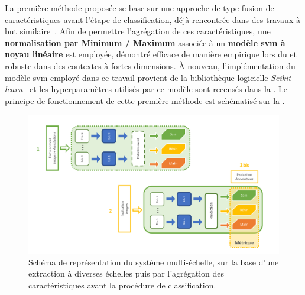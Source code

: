 La première méthode proposée se base sur une approche de type fusion de caractéristiques avant l'étape de classification, déjà rencontrée dans des travaux à but similaire~\cite{Pedersoli2011,Alsaih2016}. Afin de permettre l'agrégation de ces caractéristiques, une \textbf{normalisation par Minimum / Maximum} associée à un \textbf{modèle \gls{svm} à noyau linéaire} est employée, démontré efficace de manière empirique lors du  et robuste dans des contextes à fortes dimensions. À nouveau, l'implémentation du modèle \gls{svm} employé dans ce travail provient de la bibliothèque logicielle \textit{Scikit-learn}~\cite{pedregosa2011} et les hyperparamètres utilisés par ce modèle sont recensés dans la . Le principe de fonctionnement de cette première méthode est schématisé sur la .\par

\begin{figure}[H]
    \centering
    \includegraphics[width=0.9\linewidth]{contents/chapter_6/resources/scheme_image_improvement_multiscale_features.pdf}
    \caption{Schéma de représentation du système multi-échelle, sur la base d'une extraction à diverses échelles puis par l'agrégation des caractéristiques avant la procédure de classification.}
    \label{fig:scheme_image_improvement_multiscale_features}
\end{figure}\par

